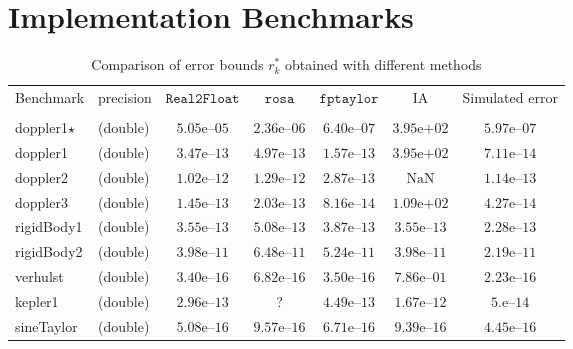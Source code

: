 \documentclass[a4paper,10pt]{article}
\newcommand{\nan}{\text{NaN}}
\newcommand{\realtofloat}{\mathtt{Real2Float}}
\newcommand{\rosa}{\mathtt{rosa}}
\newcommand{\fptaylor}{\mathtt{fptaylor}}
\theoremstyle{plain}
\theoremstyle{definition}
\theoremstyle{remark}
\begin{document}
\section{Implementation Benchmarks} %
\label{sec:benchs}
\begin{table}[!ht]
\begin{center}
\caption{Comparison of error bounds $r_k^*$ obtained with different methods}
\begin{tabular}{p{2.3cm}lccccc}
\hline
\multirow{2}{*}{Benchmark} & \multirow{2}{*}{precision} & \multirow{2}{*}{$\realtofloat$} & $\rosa$  & $\fptaylor$  &\multirow{2}{*}{IA} & \multirow{2}{*}{Simulated error}
\\
& & & \cite{Darulova14Popl} & \cite{fptaylor15} & & \\
\hline            
\multirow{1}{*}{doppler1$\star$}
& (double) & $5.05\text{e--}05$ & $2.36\text{e--}06$ & $6.40\text{e--}07$ & $3.95\text{e+}02$ & $5.97\text{e--}07$\\
\multirow{1}{*}{doppler1}
& (double) & $3.47\text{e--}13$ & $4.97\text{e--}13$ & $1.57\text{e--}13$ & $3.95\text{e+}02$ & $7.11\text{e--}14$\\
\multirow{1}{*}{doppler2}
& (double) & $1.02\text{e--}12$ & $1.29\text{e--}12$ & $2.87\text{e--}13$ & $\nan$ & $1.14\text{e--}13$\\
\multirow{1}{*}{doppler3}
& (double) & $1.45\text{e--}13$ & $2.03\text{e--}13$ & $8.16\text{e--}14$ & $1.09\text{e+}02$ & $4.27\text{e--}14$\\
\multirow{1}{*}{rigidBody1}
& (double) & $3.55\text{e--}13$ & $5.08\text{e--}13$ & $3.87\text{e--}13$ & $3.55\text{e--}13$ & $2.28\text{e--}13$\\
\multirow{1}{*}{rigidBody2}
& (double) & $3.98\text{e--}11$ & $6.48\text{e--}11$ & $5.24\text{e--}11$ & $3.98\text{e--}11$ & $2.19\text{e--}11$\\
\multirow{1}{*}{verhulst}
& (double) & $3.40\text{e--}16$ & $6.82\text{e--}16$ & $3.50\text{e--}16$ & $7.86\text{e--}01$ & $2.23\text{e--}16$\\
\multirow{1}{*}{kepler1}
& (double) & $2.96\text{e--}13$ & ? & $4.49\text{e--}13$ & $1.67\text{e--}12$ & $5.\text{e--}14$\\
\hline
\multirow{2}{*}{sineTaylor}
& (double) & $5.08\text{e--}16$ & $9.57\text{e--}16$ & $6.71\text{e--}16$ & $9.39\text{e--}16$ & $4.45\text{e--}16$\\

\end{tabular}
\end{center}
\end{table}
\end{document}
